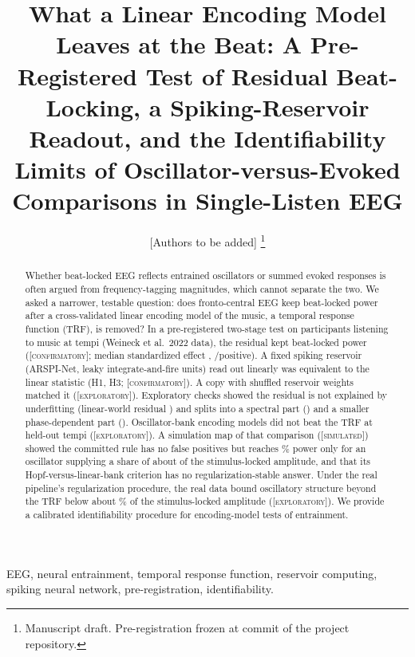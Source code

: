 \documentclass[journal]{IEEEtran}
\newcommand{\Conf}{\textsc{[confirmatory]}\xspace}
\newcommand{\Expl}{\textsc{[exploratory]}\xspace}
\newcommand{\Simul}{\textsc{[simulated]}\xspace}
\begin{document}
\title{What a Linear Encoding Model Leaves at the Beat: A Pre-Registered Test of Residual Beat-Locking, a Spiking-Reservoir Readout, and the Identifiability Limits of Oscillator-versus-Evoked Comparisons in Single-Listen EEG}
\author{[Authors to be added]%
\thanks{Manuscript draft. Pre-registration frozen at commit \NumCommitPreregFreeze of the project repository.}}
\maketitle

\begin{abstract}
Whether beat-locked EEG reflects entrained oscillators or summed evoked responses is often argued from frequency-tagging magnitudes, which cannot separate the two. We asked a narrower, testable question: does fronto-central EEG keep beat-locked power after a cross-validated linear encoding model of the music, a temporal response function (TRF), is removed? In a pre-registered two-stage test on \NumNTwo participants listening to music at \NumNTempi tempi (Weineck et al.\ 2022 data), the residual kept beat-locked power (\Conf; median standardized effect \NumHTwoDelta, \NumHTwoPos/\NumNTwo positive). A fixed spiking reservoir (ARSPI-Net, \NumResUnits leaky integrate-and-fire units) read out linearly was equivalent to the linear statistic (H1, H3; \Conf). A copy with shuffled reservoir weights matched it (\Expl). Exploratory checks showed the residual is not explained by underfitting (linear-world residual \NumLinWorld) and splits into a spectral part (\NumSpectral) and a smaller phase-dependent part (\NumPhase). Oscillator-bank encoding models did not beat the TRF at held-out tempi (\Expl). A simulation map of that comparison (\Simul) showed the committed rule has no false positives but reaches \NumPowerPct\% power only for an oscillator supplying a share of about \NumWA of the stimulus-locked amplitude, and that its Hopf-versus-linear-bank criterion has no regularization-stable answer. Under the real pipeline's regularization procedure, the real data bound oscillatory structure beyond the TRF below about \NumTierBPct\% of the stimulus-locked amplitude (\Expl). We provide a calibrated identifiability procedure for encoding-model tests of entrainment.
\end{abstract}

\begin{IEEEkeywords}
EEG, neural entrainment, temporal response function, reservoir computing, spiking neural network, pre-registration, identifiability.
\end{IEEEkeywords}
\end{document}
